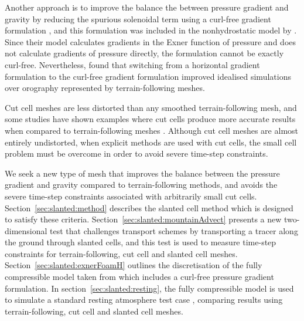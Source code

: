 Another approach is to improve the balance the between pressure gradient and gravity by reducing the spurious solenoidal term using a curl-free gradient formulation \citep{thuburn-cotter2012}, and this formulation was included in the nonhydrostatic model by \citet{weller-shahrokhi2014}.
Since their model calculates gradients in the Exner function of pressure and does not calculate gradients of pressure directly, the formulation cannot be exactly curl-free.
Nevertheless, \citet{weller-shahrokhi2014} found that switching from a horizontal gradient formulation to the curl-free gradient formulation improved idealised simulations over orography represented by terrain-following meshes.

Cut cell meshes are less distorted than any smoothed terrain-following mesh, and some studies have shown examples where cut cells produce more accurate results when compared to terrain-following meshes \citep{good2014,steppeler2013}.
Although cut cell meshes are almost entirely undistorted, when explicit methods are used with cut cells, the small cell problem must be overcome in order to avoid severe time-step constraints.

We seek a new type of mesh that improves the balance between the pressure gradient and gravity compared to terrain-following methods, and avoids the severe time-step constraints associated with arbitrarily small cut cells.  Section~\ref{sec:slanted:method} describes the slanted cell method which is designed to satisfy these criteria.
Section~\ref{sec:slanted:mountainAdvect} presents a new two-dimensional test that challenges transport schemes by transporting a tracer along the ground through slanted cells, and this test is used to measure time-step constraints for terrain-following, cut cell and slanted cell meshes.
Section~\ref{sec:slanted:exnerFoamH} outlines the discretisation of the fully compressible model taken from \citet{weller-shahrokhi2014} which includes a curl-free pressure gradient formulation.
In section~\ref{sec:slanted:resting}, the fully compressible model is used to simulate a standard resting atmosphere test case \citep{klemp2011}, comparing results using terrain-following, cut cell and slanted cell meshes.





